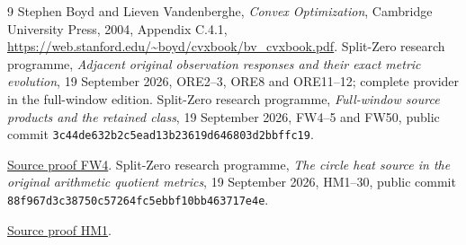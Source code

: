 \documentclass[11pt]{article}
\begin{document}
\begin{thebibliography}{9}
 Stephen Boyd and Lieven Vandenberghe,
\emph{Convex Optimization}, Cambridge University Press, 2004,
Appendix C.4.1,
\url{https://web.stanford.edu/~boyd/cvxbook/bv_cvxbook.pdf}.
 Split-Zero research programme,
\emph{Adjacent original observation responses and their exact metric
evolution}, 19 September 2026, ORE2--3, ORE8 and ORE11--12;
complete provider in the full-window edition.
 Split-Zero research programme,
\emph{Full-window source products and the retained class},
19 September 2026, FW4--5 and FW50, public commit
\texttt{3c44de632b2c5ead13b23619d646803d2bbffc19}.

\href{https://github.com/KokunoYumeto/zeta-function-research-reader/blob/5992ad50c0f2a06921f1fcaded7b4e38097c0739/workbenches/splitzero-tandem/continuations/20260920-original-kernel-mixed-determinants/providers/FULL_WINDOW_SOURCE_PRODUCTS.tex\#L67}{Source proof FW4}.
 Split-Zero research programme,
\emph{The circle heat source in the original arithmetic quotient metrics},
19 September 2026, HM1--30, public commit
\texttt{88f967d3c38750c57264fc5ebbf10bb463717e4e}.

\href{https://github.com/KokunoYumeto/zeta-function-research-reader/blob/5992ad50c0f2a06921f1fcaded7b4e38097c0739/workbenches/splitzero-tandem/continuations/20260920-original-kernel-mixed-determinants/providers/HEAT_TO_ORIGINAL_QUOTIENT_METRICS.tex\#L31}{Source proof HM1}.
\end{thebibliography}
\end{document}
